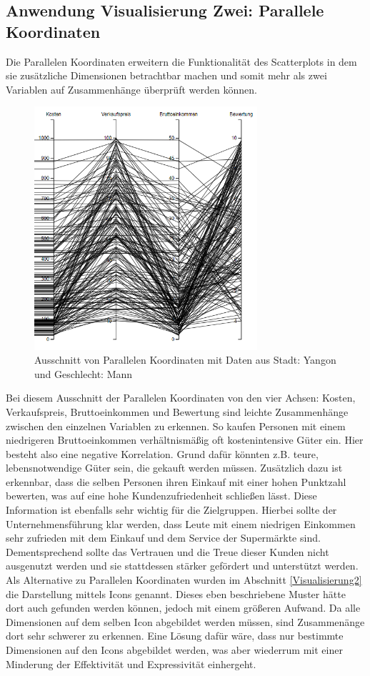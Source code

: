 \documentclass[usegeometry=true]{scrartcl}
\begin{document}
\subsection{Anwendung Visualisierung Zwei: Parallele Koordinaten}
Die Parallelen Koordinaten erweitern die Funktionalität des Scatterplots in dem sie zusätzliche Dimensionen betrachtbar machen und somit mehr als zwei Variablen auf Zusammenhänge
überprüft werden können.

\begin{figure} [H]
	\begin{center}
		\includegraphics[height=9cm]{IMG/ZusammenhangParCoord.png}
		\caption{Ausschnitt von Parallelen Koordinaten mit Daten aus Stadt: Yangon und Geschlecht: Mann}
		\label{fig:ZusammenhangParCoord}
	\end{center}
\end{figure}

\noindent Bei diesem Ausschnitt der Parallelen Koordinaten von den vier Achsen: Kosten, Verkaufspreis, Bruttoeinkommen und Bewertung sind leichte Zusammenhänge zwischen den
einzelnen Variablen zu erkennen. So kaufen Personen mit einem niedrigeren Bruttoeinkommen verhältnismäßig oft kostenintensive Güter ein. Hier besteht also eine negative
Korrelation. Grund dafür könnten z.B. teure, lebensnotwendige Güter sein, die gekauft werden müssen.
Zusätzlich dazu ist erkennbar, dass die selben Personen ihren Einkauf mit einer hohen Punktzahl bewerten, was auf eine hohe Kundenzufriedenheit schließen lässt. Diese Information
ist ebenfalls sehr wichtig für die Zielgruppen. Hierbei sollte der Unternehmensführung klar werden, dass Leute mit einem niedrigen Einkommen sehr zufrieden mit dem Einkauf und
dem Service der Supermärkte sind. Dementsprechend sollte das Vertrauen und die Treue dieser Kunden nicht ausgenutzt werden und sie stattdessen stärker gefördert und unterstützt
werden.\\
\noindent Als Alternative zu Parallelen Koordinaten wurden im Abschnitt \ref{Visualisierung2} die Darstellung mittels Icons genannt. Dieses eben beschriebene Muster hätte dort
auch gefunden werden können, jedoch mit einem größeren Aufwand. Da alle Dimensionen auf dem selben Icon abgebildet werden müssen, sind Zusammenänge dort sehr schwerer zu erkennen.
Eine Lösung dafür wäre, dass nur bestimmte Dimensionen auf den Icons abgebildet werden, was aber wiederrum mit einer Minderung der Effektivität und Expressivität einhergeht.
\end{document}
